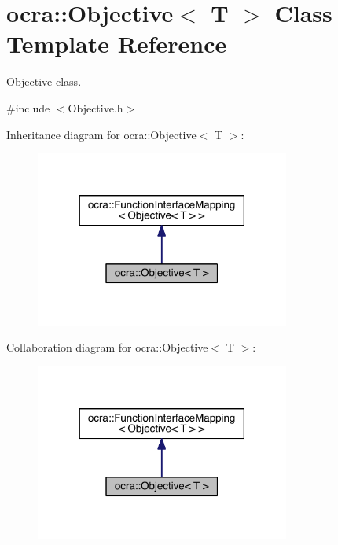 \hypertarget{classocra_1_1Objective}{}\section{ocra\+:\+:Objective$<$ T $>$ Class Template Reference}
\label{classocra_1_1Objective}


Objective class.  




{\ttfamily \#include $<$Objective.\+h$>$}



Inheritance diagram for ocra\+:\+:Objective$<$ T $>$\+:\nopagebreak
\begin{figure}[H]
\begin{center}
\leavevmode
\includegraphics[width=237pt]{d3/dcc/classocra_1_1Objective__inherit__graph}
\end{center}
\end{figure}


Collaboration diagram for ocra\+:\+:Objective$<$ T $>$\+:\nopagebreak
\begin{figure}[H]
\begin{center}
\leavevmode
\includegraphics[width=237pt]{d7/d80/classocra_1_1Objective__coll__graph}
\end{center}
\end{figure}
